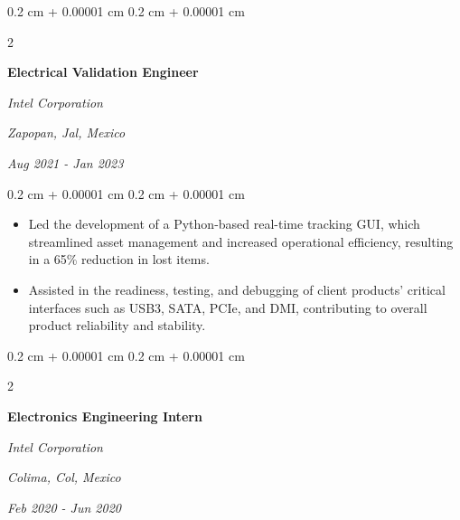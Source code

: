 \documentclass[10pt, letterpaper]{article}
\newenvironment{highlights}{
    \begin{itemize}[
        topsep=0.10 cm,
        parsep=0.10 cm,
        partopsep=0pt,
        itemsep=0pt,
        leftmargin=0.4 cm + 10pt
    ]
}{
    \end{itemize}
} %
\newenvironment{onecolentry}{
    \begin{adjustwidth}{
        0.2 cm + 0.00001 cm
    }{
        0.2 cm + 0.00001 cm
    }
}{
    \end{adjustwidth}
} %
\newenvironment{twocolentry}[2][]{
    \onecolentry
    \def\secondColumn{#2}
    \setcolumnwidth{\fill, 4.5 cm}
    \begin{paracol}{2}
}{
    \switchcolumn \raggedleft \secondColumn
    \end{paracol}
    \endonecolentry
} %
\begin{document}
    \vspace{0.2 cm}

    \begin{twocolentry}{
    \textit{Zapopan, Jal, Mexico}    
        
    \textit{Aug 2021 - Jan 2023}}
        \textbf{Electrical Validation Engineer}
        
        \textit{Intel Corporation}
    \end{twocolentry}

    \vspace{0.10 cm}
    \begin{onecolentry}
        \begin{highlights}
            \item Led the development of a Python-based real-time tracking GUI, which streamlined asset management and increased operational efficiency, resulting in a 65\% reduction in lost items. %
            
            \item Assisted in the readiness, testing, and debugging of client products' critical interfaces such as USB3, SATA, PCIe, and DMI, contributing to overall product reliability and stability. %
        \end{highlights}
    \end{onecolentry}

    \vspace{0.2 cm}

    \begin{twocolentry}{
    \textit{Colima, Col, Mexico}    
        
    \textit{Feb 2020 - Jun 2020}}
        \textbf{Electronics Engineering Intern}
        
        \textit{Intel Corporation}
    \end{twocolentry}
\end{document}
